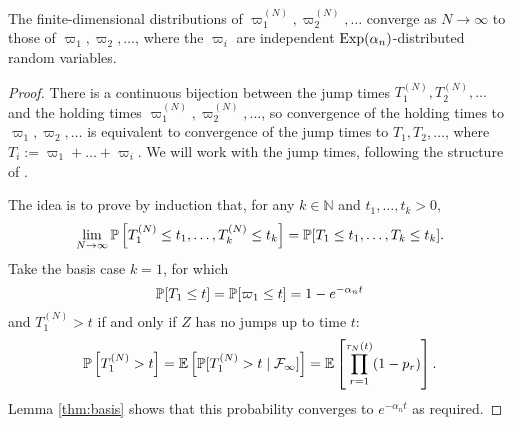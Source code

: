 \begin{lemma}\label{thm:holdingtimes_distn}
The finite-dimensional distributions of $\varpi_1^{(N)} , \varpi_2^{(N)} , \dots$ converge as $N\to\infty$ to those of $\varpi_1, \varpi_2, \dots$, where the $\varpi_i$ are independent $\operatorname{Exp}(\alpha_n)$-distributed random variables.
\end{lemma}

\begin{proof}
There is a continuous bijection between the jump times $T_1^{(N)} ,T_2^{(N)},\dots$ and the holding times $\varpi_1^{(N)}, \varpi_2^{(N)}, \dots$, so convergence of the holding times to $\varpi_1, \varpi_2,\dots$ is equivalent to convergence of the jump times to $T_1, T_2, \dots$, where $T_i := \varpi_1+\dots+\varpi_i$. 
We will work with the jump times, following the structure of \textcite[Lemma 3.2]{mohle1999}.

The idea is to prove by induction that, for any $k\in\mathbb{N}$ and $t_1,\dots,t_k >0$,
\begin{equation}\label{eq:518}
\lim_{N\to\infty} \mathbb{P}\left[ T_1^{(N)} \leq t_1, \dots , T_k^{(N)} \leq t_k \right]
= \mathbb{P}[ T_1 \leq t_1, \dots , T_k \leq t_k ] .
\end{equation}
Take the basis case $k=1$, for which
\begin{equation*}
\mathbb{P}[ T_1 \leq t ] 
= \mathbb{P}[ \varpi_1 \leq t ] = 1 - e^{-\alpha_n t}
\end{equation*}
and $T_1^{(N)} >t$ if and only if $Z$ has no jumps up to time $t$:
\begin{equation*}
\mathbb{P}\left[T_1^{(N)} >t \right]
= \mathbb{E}\left[ \mathbb{P}[ T_1^{(N)} >t \mid \mathcal{F}_\infty ] \right]
= \mathbb{E}\left[ \prod_{r=1}^{\tau_N(t)} (1-p_r) \right] .
\end{equation*}
Lemma \ref{thm:basis} shows that this probability converges to $e^{-\alpha_n t}$ as required.


\end{proof}
